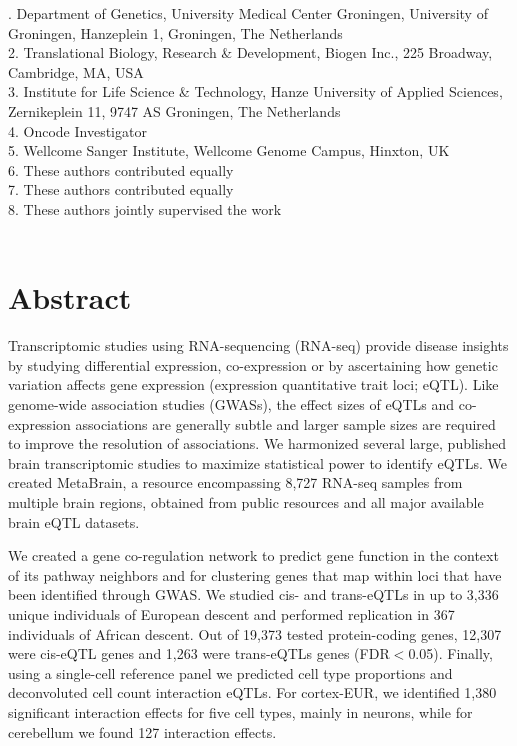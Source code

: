 {{. Department of Genetics, University Medical Center Groningen, University of Groningen, Hanzeplein 1, Groningen, The Netherlands \\
2. Translational Biology, Research \& Development, Biogen Inc., 225 Broadway, Cambridge, MA, USA \\
3. Institute for Life Science \& Technology, Hanze University of Applied Sciences, Zernikeplein 11, 9747 AS Groningen, The Netherlands \\
4. Oncode Investigator \\
5. Wellcome Sanger Institute, Wellcome Genome Campus, Hinxton, UK \\
6. These authors contributed equally \\
7. These authors contributed equally \\
8. These authors jointly supervised the work 
\\
\\

\newpage

\section*{Abstract}
Transcriptomic studies using RNA-sequencing (RNA-seq) provide disease insights by studying differential expression, co-expression or by ascertaining how genetic variation affects gene expression (expression quantitative trait loci; eQTL). Like genome-wide association studies (GWASs), the effect sizes of eQTLs and co-expression associations are generally subtle and larger sample sizes are required to improve the resolution of associations. We harmonized several large, published brain transcriptomic studies to maximize statistical power to identify eQTLs. We created MetaBrain, a resource encompassing 8,727 RNA-seq samples from multiple brain regions, obtained from public resources and all major available brain eQTL datasets.  

We created a gene co-regulation network to predict gene function in the context of its pathway neighbors and for clustering genes that map within loci that have been identified through GWAS. We studied cis- and trans-eQTLs in up to 3,336 unique individuals of European descent and performed replication in 367 individuals of African descent. Out of 19,373 tested protein-coding genes, 12,307 were cis-eQTL genes and 1,263 were trans-eQTLs genes (FDR$<$0.05). Finally, using a single-cell reference panel we predicted cell type proportions and deconvoluted cell count interaction eQTLs. For cortex-EUR, we identified 1,380 significant interaction effects for five cell types, mainly in neurons, while for cerebellum we found 127 interaction effects. 

}}

